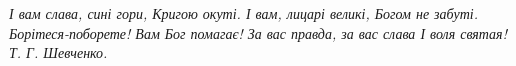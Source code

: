 
 
 
 
 

\begin{center}
\Large\color{blue}\em
\obeycr
І вам слава, сині гори,
Кригою окуті.
І вам, лицарі великі,
Богом не забуті.
Борітеся-поборете!
Вам Бог помагає!
За вас правда, за вас слава
І воля святая!
\restorecr
\vspace{0.5cm}
Т. Г. Шевченко.
\end{center}

